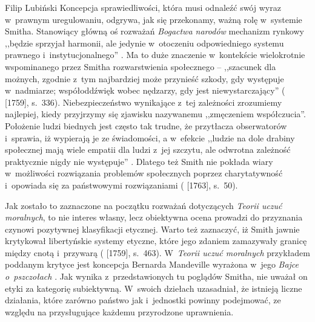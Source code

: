 \begin{artplenv}{Filip Lubiński}
Koncepcja sprawiedliwości, która musi odnaleźć swój wyraz w~prawnym uregulowaniu, odgrywa, jak się przekonamy, ważną
rolę w~systemie Smitha. Stanowiący główną oś rozważań \textit{Bogactwa narodów} mechanizm rynkowy ,,będzie sprzyjał
harmonii, ale jedynie w~otoczeniu odpowiedniego systemu prawnego i~instytucjonalnego''
\parencite[s.~83]{blaug_teoria_1994}.
Ma to duże znaczenie w~kontekście wielokrotnie wspominanego przez Smitha rozwarstwienia
społecznego -- ,,szacunek dla możnych, zgodnie z~tym najbardziej może przynieść szkody,
gdy występuje w~nadmiarze; współoddźwięk wobec
nędzarzy, gdy jest niewystarczający''
(\cite{smith_teoria_1989} [1759], s.~336).
Niebezpieczeństwo
wynikające z~tej zależności zrozumiemy najlepiej, kiedy przyjrzymy się zjawisku nazywanemu ,,zmęczeniem współczucia''.
Położenie ludzi biednych jest często tak trudne, że przytłacza obserwatorów i~sprawia, iż wypierają je ze świadomości,
a w~efekcie ,,ludzie na dole drabiny społecznej mają wiele empatii dla ludzi z~jej szczytu, ale odwrotna zależność
praktycznie nigdy nie występuje''
\parencite[s.~95]{graeber_utopia_2016}.
Dlatego też Smith nie pokłada
wiary w~możliwości rozwiązania problemów społecznych poprzez charytatywność i~opowiada się za państwowymi rozwiązaniami
(\cite{smith_lectures_1982} [1763], s.~50).

Jak zostało to zaznaczone na początku rozważań dotyczących \textit{Teorii uczuć moralnych}, to nie interes
własny, lecz obiektywna ocena prowadzi do przyznania czynowi pozytywnej klasyfikacji etycznej. Warto też zaznaczyć, iż
Smith jawnie krytykował libertyńskie systemy etyczne, które jego zdaniem zamazywały granicę między cnotą i~przywarą
(\cite{smith_teoria_1989} [1759], s.~463).
W~\textit{Teorii uczuć moralnych} przykładem poddanym krytyce
jest koncepcja Bernarda Mandeville wyrażona w~jego \textit{Bajce o~pszczołach}
\parencite[s.~186–188]{mandeville_bajka_1957}.
Jak wynika z~przedstawionych tu poglądów Smitha, nie uważał on etyki za kategorię subiektywną.
W~swoich dziełach uzasadniał, że istnieją liczne działania, które zarówno państwo jak i~jednostki powinny podejmować, ze
względu na przysługujące każdemu przyrodzone uprawnienia.


\end{artplenv}
